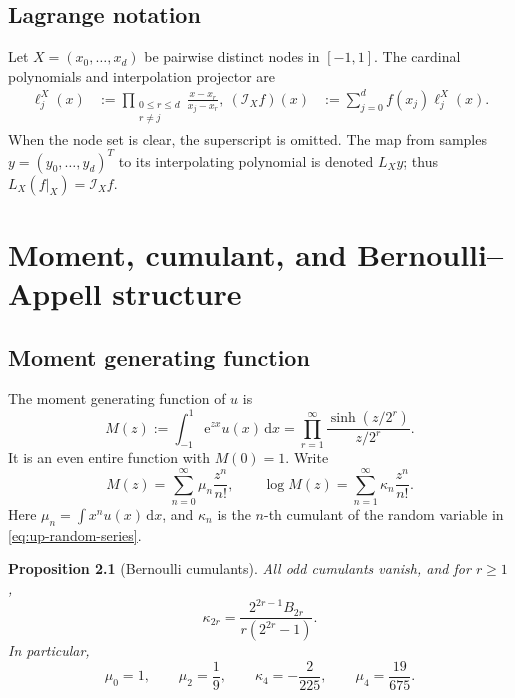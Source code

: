 \documentclass[11pt,oneside]{book}
\newtheorem{proposition}[theorem]{Proposition}
\theoremstyle{definition}
\theoremstyle{remark}
\newcommand{\Iop}{\mathcal I}
\newcommand{\dd}{\,\mathrm d}
\newcommand{\e}{\mathrm e}
\begin{document}
\section{Lagrange notation}
Let \(X=(x_0,\ldots,x_d)\) be pairwise distinct nodes in \([-1,1]\).  The cardinal polynomials and interpolation projector are
\begin{align}
 \ell_j^X(x)&:=\prod_{\substack{0\le r\le d\\r\ne j}}
 \frac{x-x_r}{x_j-x_r},\label{eq:lagrange-cardinal}\
 (\Iop_X f)(x)&:=\sum_{j=0}^{d}f(x_j)\ell_j^X(x).
 \label{eq:lagrange-projector}
\end{align}
When the node set is clear, the superscript is omitted.  The map from samples \(y=(y_0,\ldots,y_d)^T\) to its interpolating polynomial is denoted \(L_Xy\); thus \(L_X(f|_X)=\Iop_Xf\).

\chapter{Moment, cumulant, and Bernoulli--Appell structure}
\label{ch:appell}

\section{Moment generating function}
The moment generating function of \(u\) is
\begin{equation}
 M(z):=\int_{-1}^{1}\e^{zx}u(x)\dd x
 =\prod_{r=1}^{\infty}\frac{\sinh(z/2^r)}{z/2^r}.
 \label{eq:mgf}
\end{equation}
It is an even entire function with \(M(0)=1\).  Write
\begin{equation}
 M(z)=\sum_{n=0}^{\infty}\mu_n\frac{z^n}{n!},
 \qquad
 \log M(z)=\sum_{n=1}^{\infty}\kappa_n\frac{z^n}{n!}.
 \label{eq:moments-cumulants}
\end{equation}
Here \(\mu_n=\int x^nu(x)\dd x\), and \(\kappa_n\) is the \(n\)-th cumulant of the random variable in \cref{eq:up-random-series}.

\begin{proposition}[Bernoulli cumulants]
\label{prop:cumulants}
All odd cumulants vanish, and for \(r\ge1\),
\begin{equation}
 \kappa_{2r}=\frac{2^{2r-1}B_{2r}}{r(2^{2r}-1)}.
 \label{eq:cumulants}
\end{equation}
In particular,
\[
 \mu_0=1,\qquad \mu_2=\frac19,\qquad
 \kappa_4=-\frac{2}{225},\qquad \mu_4=\frac{19}{675}.
\]
\end{proposition}
\end{document}
